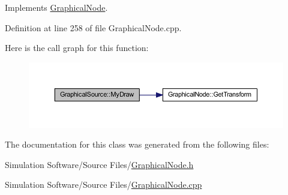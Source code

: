Implements \hyperlink{class_graphical_node_a4a5d4f48454a9721a940499d4f59b0ce}{Graphical\+Node}.



Definition at line 258 of file Graphical\+Node.\+cpp.

Here is the call graph for this function\+:
\nopagebreak
\begin{figure}[H]
\begin{center}
\leavevmode
\includegraphics[width=350pt]{class_graphical_source_af01b1de06f0e6653edd60b59a279b154_cgraph}
\end{center}
\end{figure}


The documentation for this class was generated from the following files\+:\begin{DoxyCompactItemize}
\item 
Simulation Software/\+Source Files/\hyperlink{_graphical_node_8h}{Graphical\+Node.\+h}\item 
Simulation Software/\+Source Files/\hyperlink{_graphical_node_8cpp}{Graphical\+Node.\+cpp}\end{DoxyCompactItemize}

